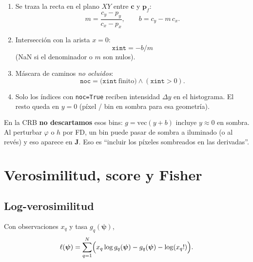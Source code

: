 \documentclass[11pt,a4paper]{article}
\theoremstyle{definition}
\newcommand{\vect}[1]{\boldsymbol{#1}}
\newcommand{\matr}[1]{\mathbf{#1}}
\begin{document}
\begin{enumerate}[nosep]
    \item Se traza la recta en el plano $XY$ entre $\vect{c}$ y $\vect{p}_f$:
    \[
        m=\frac{c_y-p_y}{c_x-p_x},\qquad
        b=c_y-m\,c_x.
    \]
    \item Intersecci\'on con la arista $x=0$:
    \[
        \texttt{xint}=-b/m
    \]
    (NaN si el denominador o $m$ son nulos).
    \item M\'ascara de caminos \emph{no ocluidos}:
    \begin{equation}
        \texttt{noc}
        =
        \bigl(\texttt{xint}\ \text{finito}\bigr)
        \land
        (\texttt{xint}>0).
        \label{eq:noc}
    \end{equation}
    \item Solo los \'indices con \texttt{noc=True} reciben intensidad
          $\Delta y$ en el histograma. El resto queda en $y=0$
          (p\'ixel / bin en sombra para esa geometr\'ia).
\end{enumerate}

En la CRB \textbf{no descartamos} esos bins: $g=\mathrm{vec}(y+b)$ incluye
$y\approx 0$ en sombra. Al perturbar $\varphi$ o $h$ por FD, un bin puede
pasar de sombra a iluminado (o al rev\'es) y eso aparece en $\matr{J}$.
Eso es ``incluir los p\'ixeles sombreados en las derivadas''.

\section{Verosimilitud, score y Fisher}
\label{sec:fisher}

\subsection{Log-verosimilitud}
Con observaciones $x_q$ y tasa $g_q(\vect{\psi})$,
\begin{equation}
    \ell(\vect{\psi})
    =
    \sum_{q=1}^{N}
    \Bigl(
        x_q\log g_q(\vect{\psi})
        -
        g_q(\vect{\psi})
        -
        \log(x_q!)
    \Bigr).
    \label{eq:ll}
\end{equation}
\end{document}
